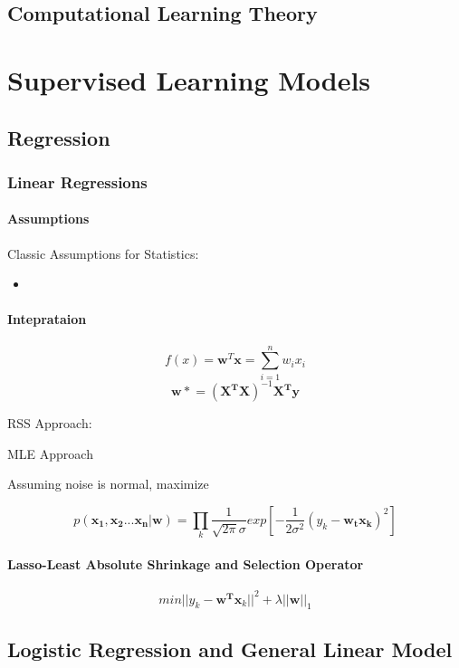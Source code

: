 \documentclass[11pt, openany]{book}              %
\begin{document}
\chapter{Computational Learning Theory}

\part{Supervised Learning Models}

\chapter{Regression}

\section{Linear Regressions}


\subsection{Assumptions}
Classic Assumptions for Statistics:
\begin{itemize}
    \item 
\end{itemize}

\subsection{Inteprataion}

$$ f(x) = \mathbf{w}^T \mathbf{x} = \sum_{i=1}^n w_i x_i $$
$$ \mathbf{w*} = (\mathbf{X^T X})^{-1} \mathbf{X^T y} $$

RSS Approach:


MLE Approach

Assuming noise is normal, maximize 

$$p(\mathbf{x_1, x_2 ... x_n}| \mathbf{ w} ) = \prod_k \frac{1}{\sqrt{2\pi} \sigma} exp[ -\frac{1}{2\sigma^2} (y_k - \mathbf{w_t x_k} )^2 ]$$ 

\subsection{Lasso-Least Absolute Shrinkage and Selection Operator}

$$ min ||y_k - \mathbf{w^T x}_k ||^2 + \lambda ||\mathbf{w}||_1 $$

\chapter{Logistic Regression and General Linear Model}
\end{document}

